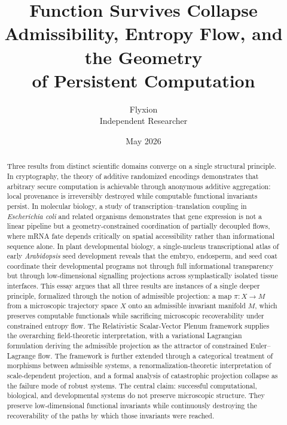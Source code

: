 \documentclass[12pt, a4paper]{article}
\title{\textbf{Function Survives Collapse}\\[0.4em]
\large Admissibility, Entropy Flow, and the Geometry\\of Persistent Computation}
\author{Flyxion\\[0.3em]
\small Independent Researcher}
\date{May 2026}
\theoremstyle{essaystyle}
\begin{document}
\maketitle
\thispagestyle{empty}

\begin{abstract}
Three results from distinct scientific domains converge on a single structural
principle. In cryptography, the theory of additive randomized encodings demonstrates
that arbitrary secure computation is achievable through anonymous additive aggregation:
local provenance is irreversibly destroyed while computable functional invariants persist.
In molecular biology, a study of transcription--translation coupling in
\textit{Escherichia coli} and related organisms demonstrates that gene expression
is not a linear pipeline but a geometry-constrained coordination of partially decoupled
flows, where mRNA fate depends critically on spatial accessibility rather than
informational sequence alone. In plant developmental biology, a single-nucleus
transcriptional atlas of early \textit{Arabidopsis} seed development reveals that
the embryo, endosperm, and seed coat coordinate their developmental programs not
through full informational transparency but through low-dimensional signalling
projections across symplastically isolated tissue interfaces. This essay argues
that all three results are instances of a single deeper principle, formalized through
the notion of admissible projection: a map $\pi : X \to M$ from a microscopic
trajectory space $X$ onto an admissible invariant manifold $M$, which preserves
computable functionals while sacrificing microscopic recoverability under constrained
entropy flow. The Relativistic Scalar-Vector Plenum framework supplies the overarching
field-theoretic interpretation, with a variational Lagrangian formulation deriving the
admissible projection as the attractor of constrained Euler--Lagrange flow. The
framework is further extended through a categorical treatment of morphisms between
admissible systems, a renormalization-theoretic interpretation of scale-dependent
projection, and a formal analysis of catastrophic projection collapse as the failure
mode of robust systems. The central claim: successful computational, biological, and
developmental systems do not preserve microscopic structure. They preserve
low-dimensional functional invariants while continuously destroying the recoverability
of the paths by which those invariants were reached.
\end{abstract}

\tableofcontents
\newpage
\end{document}
